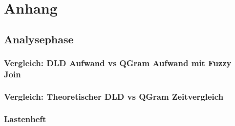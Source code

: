 \section{Anhang}
\subsection{Analysephase}
\subsubsection{Vergleich: DLD Aufwand vs QGram Aufwand mit Fuzzy Join}
\subsubsection{Vergleich: Theoretischer DLD vs QGram Zeitvergleich }

\subsubsection{Lastenheft}
\renewcommand{\labelenumii}{\theenumii}
\renewcommand{\theenumii}{\theenumi.\arabic{enumii}.}
